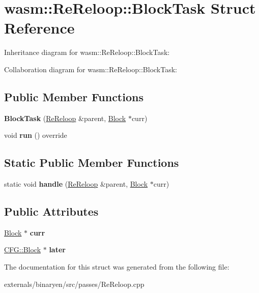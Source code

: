 \hypertarget{structwasm_1_1_re_reloop_1_1_block_task}{}\section{wasm\+:\+:Re\+Reloop\+:\+:Block\+Task Struct Reference}
\label{structwasm_1_1_re_reloop_1_1_block_task}


Inheritance diagram for wasm\+:\+:Re\+Reloop\+:\+:Block\+Task\+:


Collaboration diagram for wasm\+:\+:Re\+Reloop\+:\+:Block\+Task\+:
\subsection*{Public Member Functions}
\begin{DoxyCompactItemize}
\item 
\mbox{\label{structwasm_1_1_re_reloop_1_1_block_task_afc62db6f16f63a6c10e1a6e30dbd1d24}} 
{\bfseries Block\+Task} (\mbox{\hyperlink{structwasm_1_1_re_reloop}{Re\+Reloop}} \&parent, \mbox{\hyperlink{classwasm_1_1_block}{Block}} $\ast$curr)
\item 
\mbox{\label{structwasm_1_1_re_reloop_1_1_block_task_a327b8d8fc43896199f9fc3086552a3a2}} 
void {\bfseries run} () override
\end{DoxyCompactItemize}
\subsection*{Static Public Member Functions}
\begin{DoxyCompactItemize}
\item 
\mbox{\label{structwasm_1_1_re_reloop_1_1_block_task_a57c40cb7e164e85ae539c57047f9e233}} 
static void {\bfseries handle} (\mbox{\hyperlink{structwasm_1_1_re_reloop}{Re\+Reloop}} \&parent, \mbox{\hyperlink{classwasm_1_1_block}{Block}} $\ast$curr)
\end{DoxyCompactItemize}
\subsection*{Public Attributes}
\begin{DoxyCompactItemize}
\item 
\mbox{\label{structwasm_1_1_re_reloop_1_1_block_task_ac7b027532400b3d2f5a5f1e29e44d9f6}} 
\mbox{\hyperlink{classwasm_1_1_block}{Block}} $\ast$ {\bfseries curr}
\item 
\mbox{\label{structwasm_1_1_re_reloop_1_1_block_task_a65a6e406ebedb8ed47c18ad3bd098fc2}} 
\mbox{\hyperlink{struct_c_f_g_1_1_block}{C\+F\+G\+::\+Block}} $\ast$ {\bfseries later}
\end{DoxyCompactItemize}


The documentation for this struct was generated from the following file\+:\begin{DoxyCompactItemize}
\item 
externals/binaryen/src/passes/Re\+Reloop.\+cpp\end{DoxyCompactItemize}
